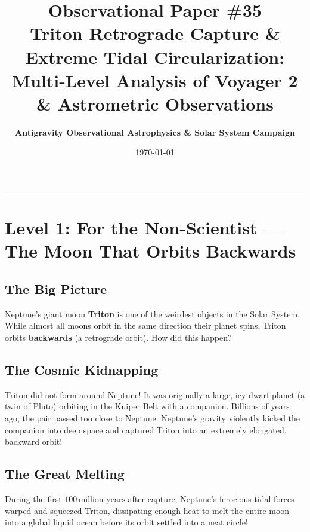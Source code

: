 \documentclass[11pt,a4paper]{article}
\title{\Huge \textbf{Observational Paper \#35}\\ \Large Triton Retrograde Capture \& Extreme Tidal Circularization: Multi-Level Analysis of Voyager 2 \& Astrometric Observations}
\author{\textbf{Antigravity Observational Astrophysics \& Solar System Campaign}}
\date{\today}
\begin{document}
\maketitle

\vspace{-1em}
\begin{center}
\rule{\textwidth}{1.5pt}
\end{center}

\section*{Level 1: For the Non-Scientist — The Moon That Orbits Backwards}

\subsection*{The Big Picture}
Neptune's giant moon \textbf{Triton} is one of the weirdest objects in the Solar System. While almost all moons orbit in the same direction their planet spins, Triton orbits \textbf{backwards} (a retrograde orbit). How did this happen?

\subsection*{The Cosmic Kidnapping}
Triton did not form around Neptune! It was originally a large, icy dwarf planet (a twin of Pluto) orbiting in the Kuiper Belt with a companion. Billions of years ago, the pair passed too close to Neptune. Neptune's gravity violently kicked the companion into deep space and captured Triton into an extremely elongated, backward orbit!

\subsection*{The Great Melting}
During the first $100\,\text{million years}$ after capture, Neptune's ferocious tidal forces warped and squeezed Triton, dissipating enough heat to melt the entire moon into a global liquid ocean before its orbit settled into a neat circle!

\newpage

\end{document}
